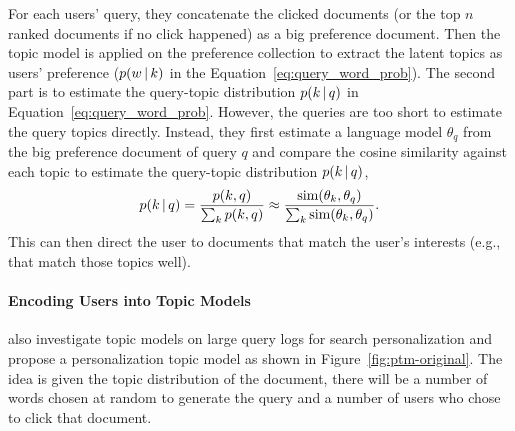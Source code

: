 For each users' query, they concatenate the clicked documents (or the
top $n$ ranked documents if no click happened) as a big preference
document. Then the topic model \plsa{} is applied on the preference
collection to extract the latent topics as users' preference ($p(w \, | \, k)$
in the Equation~\ref{eq:query_word_prob}). The second part is to
estimate the query-topic distribution $p(k \, | \, q)$ in
Equation~\ref{eq:query_word_prob}. However, the queries are too short
to estimate the query topics directly. Instead, they first estimate a
language model $\theta_q$ from the big preference document of query
$q$ and compare the cosine similarity against each topic to estimate
the query-topic distribution $p(k \, | \, q)$,
\begin{align}
p(k \, | \, q) = \frac{p(k, q)}{\sum_k p(k, q)} \approx \frac{\text{sim}(\theta_k, \theta_q)}{\sum_k \text{sim}(\theta_k, \theta_q)}.
\end{align}
This can then direct the user to documents that match the user's
interests (e.g., that match those topics well).

\paragraph{Encoding Users into Topic Models}

\citet{Carman-2010} also investigate topic models on large query logs
for search personalization and propose a personalization topic model
as shown in Figure~\ref{fig:ptm-original}. The idea is given the topic
distribution of the document, there will be a number of words chosen
at random to generate the query and a number of users who chose to
click that document.

